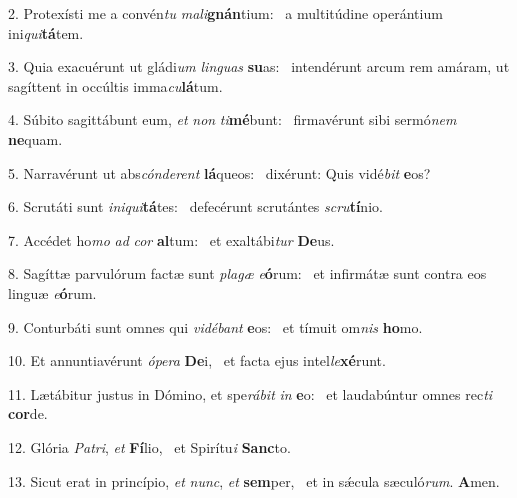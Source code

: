 2. Protexísti me a convén\textit{tu} \textit{ma}\textit{li}\textbf{gnán}tium: \ast\  a multitúdine operántium ini\textit{qui}\textbf{tá}tem.\

3. Quia exacuérunt ut gládi\textit{um} \textit{lin}\textit{guas} \textbf{su}as: \ast\  intendérunt arcum rem amáram, ut sagíttent in occúltis imma\textit{cu}\textbf{lá}tum.\

4. Súbito sagittábunt eum, \textit{et} \textit{non} \textit{ti}\textbf{mé}bunt: \ast\  firmavérunt sibi sermó\textit{nem} \textbf{ne}quam.\

5. Narravérunt ut abs\textit{cón}\textit{de}\textit{rent} \textbf{lá}queos: \ast\  dixérunt: Quis vidé\textit{bit} \textbf{e}os?\

6. Scrutáti sunt \textit{in}\textit{i}\textit{qui}\textbf{tá}tes: \ast\  defecérunt scrutántes \textit{scru}\textbf{tí}nio.\

7. Accédet ho\textit{mo} \textit{ad} \textit{cor} \textbf{al}tum: \ast\  et exaltábi\textit{tur} \textbf{De}us.\

8. Sagíttæ parvulórum factæ sunt \textit{pla}\textit{gæ} \textit{e}\textbf{ó}rum: \ast\  et infirmátæ sunt contra eos linguæ \textit{e}\textbf{ó}rum.\

9. Conturbáti sunt omnes qui \textit{vi}\textit{dé}\textit{bant} \textbf{e}os: \ast\  et tímuit om\textit{nis} \textbf{ho}mo.\

10. Et annuntiavérunt \textit{ó}\textit{pe}\textit{ra} \textbf{De}i, \ast\  et facta ejus intel\textit{le}\textbf{xé}runt.\

11. Lætábitur justus in Dómino, et spe\textit{rá}\textit{bit} \textit{in} \textbf{e}o: \ast\  et laudabúntur omnes rec\textit{ti} \textbf{cor}de.\

12. Glória \textit{Pa}\textit{tri}, \textit{et} \textbf{Fí}lio, \ast\  et Spirítu\textit{i} \textbf{Sanc}to.\

13. Sicut erat in princípio, \textit{et} \textit{nunc}, \textit{et} \textbf{sem}per, \ast\  et in sǽcula sæculó\textit{rum}. \textbf{A}men.\

